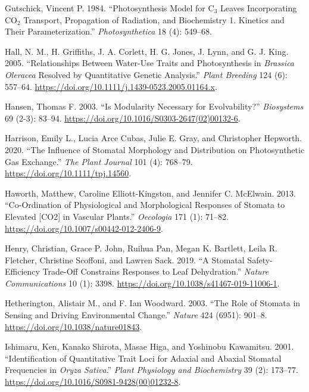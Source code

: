 \documentclass[
  12pt,
]{article}
\newlength{\cslhangindent}
\newlength{\cslentryspacingunit} %
\newenvironment{CSLReferences}[2] %
 {%
  \setlength{\parindent}{0pt}
  \ifodd #1
  \let\oldpar\par
  \def\par{\hangindent=\cslhangindent\oldpar}
  \fi
  \setlength{\parskip}{#2\cslentryspacingunit}
 }%
 {}
\begin{document}
\begin{CSLReferences}{1}{0}
\leavevmode{}%
Gutschick, Vincent P. 1984. {``Photosynthesis Model for {C}\(_{\textrm{3}}\) Leaves Incorporating {CO}\(_{\textrm{2}}\) Transport, Propagation of Radiation, and Biochemistry 1. Kinetics and Their Parameterization.''} \emph{Photosynthetica} 18 (4): 549--68.

\leavevmode{}%
Hall, N. M., H. Griffiths, J. A. Corlett, H. G. Jones, J. Lynn, and G. J. King. 2005. {``Relationships Between Water-Use Traits and Photosynthesis in \emph{{Brassica} Oleracea} Resolved by Quantitative Genetic Analysis.''} \emph{Plant Breeding} 124 (6): 557--64. \url{https://doi.org/10.1111/j.1439-0523.2005.01164.x}.

\leavevmode{}%
Hansen, Thomas F. 2003. {``Is Modularity Necessary for Evolvability?''} \emph{Biosystems} 69 (2-3): 83--94. \url{https://doi.org/10.1016/S0303-2647(02)00132-6}.

\leavevmode{}%
Harrison, Emily L., Lucia Arce Cubas, Julie E. Gray, and Christopher Hepworth. 2020. {``The Influence of Stomatal Morphology and Distribution on Photosynthetic Gas Exchange.''} \emph{The Plant Journal} 101 (4): 768--79. \url{https://doi.org/10.1111/tpj.14560}.

\leavevmode{}%
Haworth, Matthew, Caroline Elliott-Kingston, and Jennifer C. McElwain. 2013. {``Co-Ordination of Physiological and Morphological Responses of Stomata to Elevated {[}{CO2}{]} in Vascular Plants.''} \emph{Oecologia} 171 (1): 71--82. \url{https://doi.org/10.1007/s00442-012-2406-9}.

\leavevmode{}%
Henry, Christian, Grace P. John, Ruihua Pan, Megan K. Bartlett, Leila R. Fletcher, Christine Scoffoni, and Lawren Sack. 2019. {``A Stomatal Safety-Efficiency Trade-Off Constrains Responses to Leaf Dehydration.''} \emph{Nature Communications} 10 (1): 3398. \url{https://doi.org/10.1038/s41467-019-11006-1}.

\leavevmode{}%
Hetherington, Alistair M., and F. Ian Woodward. 2003. {``The Role of Stomata in Sensing and Driving Environmental Change.''} \emph{Nature} 424 (6951): 901--8. \url{https://doi.org/10.1038/nature01843}.

\leavevmode{}%
Ishimaru, Ken, Kanako Shirota, Masae Higa, and Yoshinobu Kawamitsu. 2001. {``Identification of Quantitative Trait Loci for Adaxial and Abaxial Stomatal Frequencies in \emph{{Oryza} Sativa}.''} \emph{Plant Physiology and Biochemistry} 39 (2): 173--77. \url{https://doi.org/10.1016/S0981-9428(00)01232-8}.


\end{CSLReferences}
\end{document}
